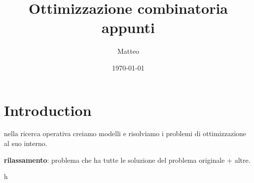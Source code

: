 \documentclass[12pt]{article}
\title{Ottimizzazione combinatoria appunti}
\author{Matteo}
\date{\today}
\begin{document}
\maketitle

\section{Introduction}

nella ricerca operativa creiamo modelli e risolviamo i problemi di ottimizzazione al suo interno.

\textbf{rilassamento}: problema che ha tutte le soluzione del problema originale + altre.



h 
\end{document}
